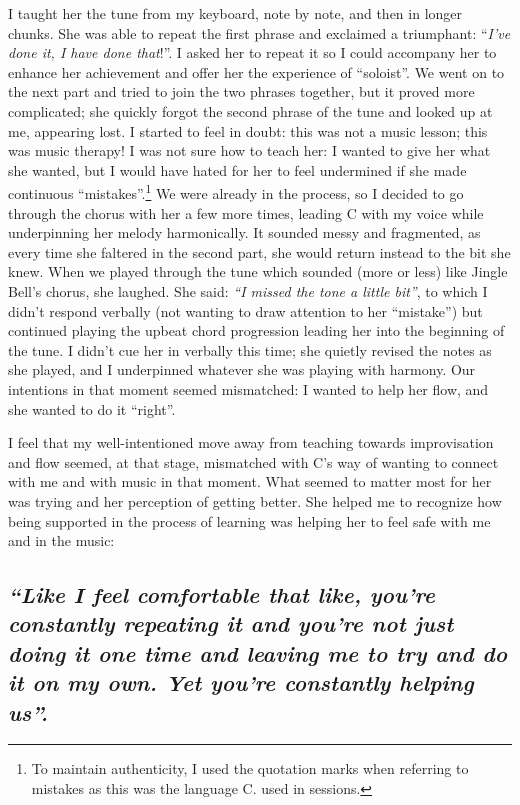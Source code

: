 \documentclass[authordate, empirical]{jote-new-article}
\begin{document}
	I taught her the tune from my keyboard, note by note, and then in longer chunks. She was able to repeat the first phrase and exclaimed a triumphant: “\emph{I've done it, I have done that}!”. I asked her to repeat it so I could accompany her to enhance her achievement and offer her the experience of “soloist”. We went on to the next part and tried to join the two phrases together, but it proved more complicated; she quickly forgot the second phrase of the tune and looked up at me, appearing lost. I started to feel in doubt: this was not a music lesson; this was music therapy! I was not sure how to teach her: I wanted to give her what she wanted, but I would have hated for her to feel undermined if she made continuous “mistakes”.\footnote{ To maintain authenticity, I used the quotation marks when referring to mistakes as this was the language C. used in sessions.} We were already in the process, so I decided to go through the chorus with her a few more times, leading C with my voice while underpinning her melody harmonically. It sounded messy and fragmented, as every time she faltered in the second part, she would return instead to the bit she knew. When we played through the tune which sounded (more or less) like Jingle Bell's chorus, she laughed. She said: \emph{“I missed the tone a little bit”}, to which I didn't respond verbally (not wanting to draw attention to her “mistake”) but continued playing the upbeat chord progression leading her into the beginning of the tune. I didn't cue her in verbally this time; she quietly revised the notes as she played, and I underpinned whatever she was playing with harmony. Our intentions in that moment seemed mismatched: I wanted to help her flow, and she wanted to do it “right”.







	I feel that my well-intentioned move away from teaching towards improvisation and flow seemed, at that stage, mismatched with C's way of wanting to connect with me and with music in that moment. What seemed to matter most for her was trying\emph{ }and her perception of getting better. She helped me to recognize how being supported in the process of learning was helping her to feel safe with me and in the music:







	\subsection{\emph{“Like I feel comfortable that like, you're constantly repeating it and you're not just doing it one time and leaving me to try and do it on my own. Yet you're constantly helping us”.}}
\end{document}
